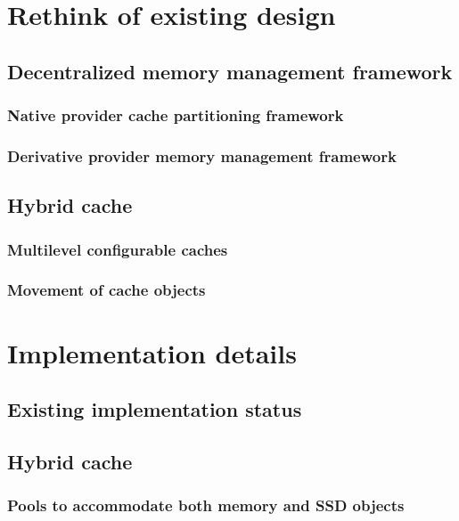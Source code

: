   \section{Rethink of existing design}
  
    \subsection{Decentralized memory management framework}
	      
      \subsubsection{Native provider cache partitioning framework}

      \subsubsection{Derivative provider memory management framework}	

    \subsection{Hybrid cache}
      
      \subsubsection{Multilevel configurable caches}
      
      \subsubsection{Movement of cache objects}
	
  \section{Implementation details}
      
    \subsection{Existing implementation status}
    
    \subsection{Hybrid cache}
    
      \subsubsection{Pools to accommodate both memory and SSD objects}
      
